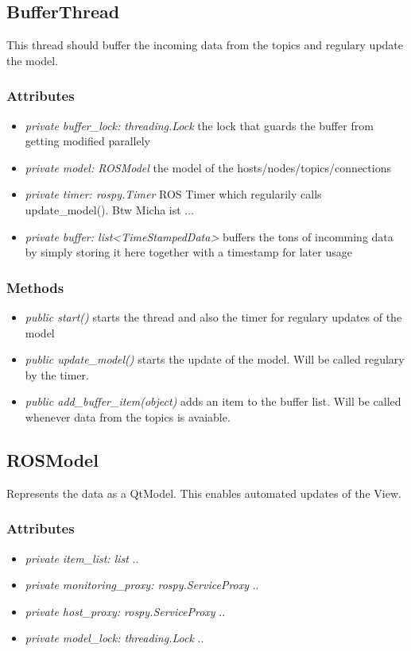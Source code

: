 \subsection{BufferThread}
This thread should buffer the incoming data from the topics and regulary update the model.
\subsubsection{Attributes}
\begin{itemize}
  \item \textit{private buffer\_lock: threading.Lock} the lock that guards the buffer from getting modified parallely
  \item \textit{private model: ROSModel} the model of the hosts/nodes/topics/connections 
  \item \textit{private timer: rospy.Timer} ROS Timer which regularily calls update\_model(). Btw Micha ist ...
  \item \textit{private buffer: list<TimeStampedData>} buffers the tons of incomming data by simply storing it here together with a timestamp for later usage
\end{itemize}
\subsubsection{Methods}
\begin{itemize}
  \item \textit{public start()} starts the thread and also the timer for regulary updates of the model
  \item \textit{public update\_model()} starts the update of the model. Will be called regulary by the timer.
  \item \textit{public add\_buffer\_item(object)} adds an item to the buffer list. Will be called whenever data from the topics is avaiable.
\end{itemize}

\subsection{ROSModel}
Represents the data as a QtModel. This enables automated updates of the View.
\subsubsection{Attributes}
\begin{itemize}
  \item \textit{private item\_list: list}
  ..
  \item \textit{private monitoring\_proxy: rospy.ServiceProxy}
  ..
  \item \textit{private host\_proxy: rospy.ServiceProxy}
  ..  
  \item \textit{private model\_lock: threading.Lock}
  ..
\end{itemize}
